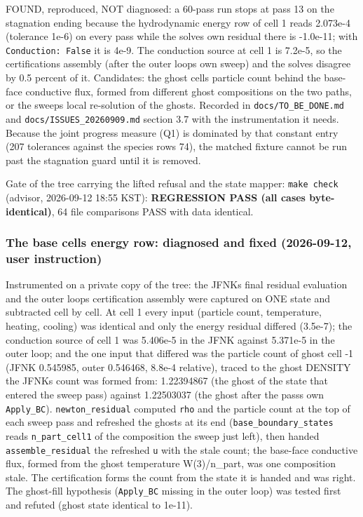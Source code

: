 \documentclass[english,a4paper]{my_memo}
\begin{document}
FOUND, reproduced, NOT diagnosed: a 60-pass run stops at pass 13 on the
stagnation ending because the hydrodynamic energy row of cell 1 reads
2.073e-4 (tolerance 1e-6) on every pass while the solve\textquotesingle s own residual there
is -1.0e-11; with \texttt{Conduction:\ False} it is 4e-9. The conduction source at
cell 1 is 7.2e-5, so the certification\textquotesingle s assembly (after the outer loop\textquotesingle s
own sweep) and the solve\textquotesingle s disagree by 0.5 percent of it. Candidates: the
ghost cell\textquotesingle s particle count behind the base-face conductive flux, formed
from different ghost compositions on the two paths, or the sweep\textquotesingle s local
re-solution of the ghosts. Recorded in \texttt{docs/TO\_BE\_DONE.md} and
\texttt{docs/ISSUES\_20260909.md} section 3.7 with the instrumentation it needs.
Because the joint progress measure (Q1) is dominated by that constant entry
(207 tolerances against the species rows\textquotesingle{} 74), the matched fixture cannot
be run past the stagnation guard until it is removed.

Gate of the tree carrying the lifted refusal and the state mapper:
\texttt{make\ check} (advisor, 2026-09-12 18:55 KST): \textbf{REGRESSION PASS (all cases
byte-identical)}, 64 file comparisons PASS with data identical.

\subsubsection{The base cell\textquotesingle s energy row: diagnosed and fixed (2026-09-12, user instruction)}\label{the-base-cells-energy-row-diagnosed-and-fixed-2026-09-12-user-instruction}

Instrumented on a private copy of the tree: the JFNK\textquotesingle s final residual
evaluation and the outer loop\textquotesingle s certification assembly were captured on ONE
state and subtracted cell by cell. At cell 1 every input (particle count,
temperature, heating, cooling) was identical and only the energy residual
differed (3.5e-7); the conduction source of cell 1 was 5.406e-5 in the JFNK
against 5.371e-5 in the outer loop; and the one input that differed was the
particle count of ghost cell -1 (JFNK 0.545985, outer 0.546468, 8.8e-4
relative), traced to the ghost DENSITY the JFNK\textquotesingle s count was formed from:
1.22394867 (the ghost of the state that entered the sweep pass) against
1.22503037 (the ghost after the pass\textquotesingle s own \texttt{Apply\_BC}). \texttt{newton\_residual}
computed \texttt{rho} and the particle count at the top of each sweep pass and
refreshed the ghosts at its end (\texttt{base\_boundary\_states} reads
\texttt{n\_part\_cell1} of the composition the sweep just left), then handed
\texttt{assemble\_residual} the refreshed \texttt{u} with the stale count; the base-face
conductive flux, formed from the ghost temperature W(3)/n\_part, was one
composition stale. The certification forms the count from the state it is
handed and was right. The ghost-fill hypothesis (\texttt{Apply\_BC} missing in the
outer loop) was tested first and refuted (ghost state identical to 1e-11).
\end{document}
